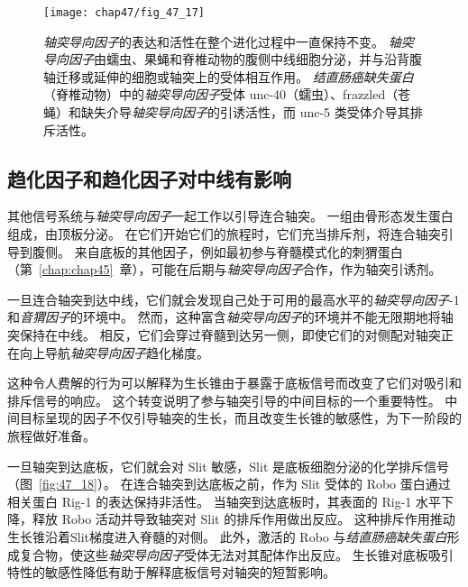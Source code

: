 \begin{figure}[htbp]
	\centering
	\texttt{[image: chap47/fig\_47\_17]}
	\caption{\textit{轴突导向因子}的表达和活性在整个进化过程中一直保持不变。
		\textit{轴突导向因子}由蠕虫、果蝇和脊椎动物的腹侧中线细胞分泌，并与沿背腹轴迁移或延伸的细胞或轴突上的受体相互作用。
		\textit{结直肠癌缺失蛋白}（脊椎动物）中的\textit{轴突导向因子}受体 unc-40（蠕虫）、frazzled（苍蝇）和缺失介导\textit{轴突导向因子}的引诱活性，而 unc-5 类受体介导其排斥活性。}
	\label{fig:47_17}
\end{figure}



\subsection{趋化因子和趋化因子对中线有影响}

其他信号系统与\textit{轴突导向因子}一起工作以引导连合轴突。
一组由骨形态发生蛋白组成，由顶板分泌。
在它们开始它们的旅程时，它们充当排斥剂，将连合轴突引导到腹侧。
来自底板的其他因子，例如最初参与脊髓模式化的刺猬蛋白（第~\ref{chap:chap45}~章），可能在后期与\textit{轴突导向因子}合作，作为轴突引诱剂。


一旦连合轴突到达中线，它们就会发现自己处于可用的最高水平的\textit{轴突导向因子}-1 和\textit{音猬因子}的环境中。
然而，这种富含\textit{轴突导向因子}的环境并不能无限期地将轴突保持在中线。
相反，它们会穿过脊髓到达另一侧，即使它们的对侧配对轴突正在向上导航\textit{轴突导向因子}趋化梯度。


这种令人费解的行为可以解释为生长锥由于暴露于底板信号而改变了它们对吸引和排斥信号的响应。
这个转变说明了参与轴突引导的中间目标的一个重要特性。
中间目标呈现的因子不仅引导轴突的生长，而且改变生长锥的敏感性，为下一阶段的旅程做好准备。


一旦轴突到达底板，它们就会对 Slit 敏感，Slit 是底板细胞分泌的化学排斥信号（图~\ref{fig:47_18}）。
在连合轴突到达底板之前，作为 Slit 受体的 Robo 蛋白通过相关蛋白 Rig-1 的表达保持非活性。
当轴突到达底板时，其表面的 Rig-1 水平下降，释放 Robo 活动并导致轴突对 Slit 的排斥作用做出反应。
这种排斥作用推动生长锥沿着Slit梯度进入脊髓的对侧。
此外，激活的 Robo 与\textit{结直肠癌缺失蛋白}形成复合物，使这些\textit{轴突导向因子}受体无法对其配体作出反应。
生长锥对底板吸引特性的敏感性降低有助于解释底板信号对轴突的短暂影响。


